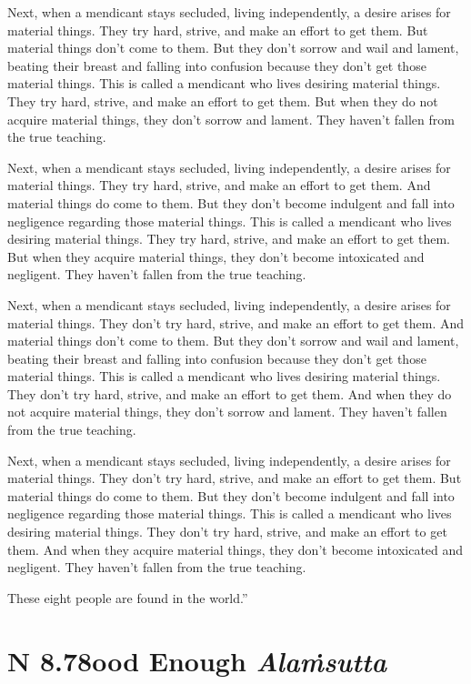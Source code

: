 \documentclass[12pt,openany]{book}%
\newcommand*{\suttatitleacronym}[1]{\smaller[2]{#1}\vspace*{.3em}}
\newcommand*{\suttatitletranslation}[1]{\linebreak{#1}}
\newcommand*{\suttatitleroot}[1]{\linebreak\smaller[2]\itshape{#1}}
\newcommand*{\tocacronym}[1]{\hspace*{-3.3em}{#1}\quad}
\newcommand*{\toctranslation}[1]{#1}
\newcommand*{\tocroot}[1]{(\textit{#1})}
\begin{document}
Next, when a mendicant stays secluded, living independently, a desire arises for material things. They try hard, strive, and make an effort to get them. But material things don’t come to them. But they don’t sorrow and wail and lament, beating their breast and falling into confusion because they don’t get those material things. This is called a mendicant who lives desiring material things. They try hard, strive, and make an effort to get them. But when they do not acquire material things, they don’t sorrow and lament. They haven’t fallen from the true teaching. 

Next, when a mendicant stays secluded, living independently, a desire arises for material things. They try hard, strive, and make an effort to get them. And material things do come to them. But they don’t become indulgent and fall into negligence regarding those material things. This is called a mendicant who lives desiring material things. They try hard, strive, and make an effort to get them. But when they acquire material things, they don’t become intoxicated and negligent. They haven’t fallen from the true teaching. 

Next, when a mendicant stays secluded, living independently, a desire arises for material things. They don’t try hard, strive, and make an effort to get them. And material things don’t come to them. But they don’t sorrow and wail and lament, beating their breast and falling into confusion because they don’t get those material things. This is called a mendicant who lives desiring material things. They don’t try hard, strive, and make an effort to get them. And when they do not acquire material things, they don’t sorrow and lament. They haven’t fallen from the true teaching. 

Next, when a mendicant stays secluded, living independently, a desire arises for material things. They don’t try hard, strive, and make an effort to get them. But material things do come to them. But they don’t become indulgent and fall into negligence regarding those material things. This is called a mendicant who lives desiring material things. They don’t try hard, strive, and make an effort to get them. And when they acquire material things, they don’t become intoxicated and negligent. They haven’t fallen from the true teaching. 

These eight people are found in the world.” 

%
\section*{{\suttatitleacronym AN 8.78}{\suttatitletranslation Good Enough }{\suttatitleroot Alaṁsutta}}
\addcontentsline{toc}{section}{\tocacronym{AN 8.78} \toctranslation{Good Enough } \tocroot{Alaṁsutta}}
\end{document}
